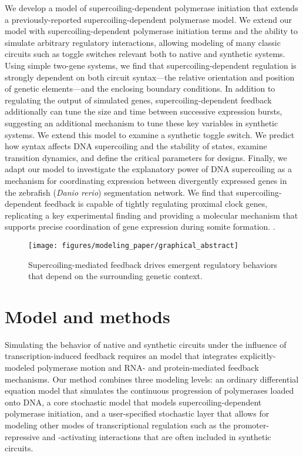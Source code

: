 \documentclass[11pt]{article}
\begin{document}
We develop a model of supercoiling-dependent polymerase initiation that extends a previously-reported supercoiling-dependent polymerase model.  \parencite{sevierPropertiesGeneExpression2018}  We extend our model with supercoiling-dependent polymerase initiation terms and the ability to simulate arbitrary regulatory interactions, allowing modeling of many classic circuits such as toggle switches relevant both to native and synthetic systems. Using simple two-gene systems, we find that supercoiling-dependent regulation is strongly dependent on both circuit syntax---the relative orientation and position of genetic elements---and the enclosing boundary conditions. In addition to regulating the output of simulated genes, supercoiling-dependent feedback additionally can tune the size and time between successive expression bursts, suggesting an additional mechanism to tune these key variables in synthetic systems. We extend this model to examine a synthetic toggle switch.
We predict how syntax affects DNA supercoiling and the stability of states, examine transition dynamics, and define the critical parameters for designs. Finally, we adapt our model to investigate the explanatory power of DNA supercoiling as a mechanism for coordinating expression between divergently expressed genes in the zebrafish (\textit{Danio rerio}) segmentation network. We find that supercoiling-dependent feedback is capable of tightly regulating proximal clock genes, replicating a key experimental finding and providing a molecular mechanism that supports precise coordination of gene expression during somite formation. \parencite{zinaniPairingSegmentationClock2021}.

\begin{figure}[h]
    \centering
    \texttt{[image: figures/modeling\_paper/graphical\_abstract]}
    \caption{Supercoiling-mediated feedback drives emergent regulatory behaviors that depend on the surrounding genetic context.} \label{fig:graphical_abstract}
\end{figure}

\section{Model and methods}
Simulating the behavior of native and synthetic circuits under the influence of transcription-induced feedback requires an model that integrates explicitly-modeled polymerase motion and RNA- and protein-mediated feedback mechanisms.
Our method combines three modeling levels: an ordinary differential equation model that simulates the continuous progression of polymerases loaded onto DNA, a core stochastic model that models supercoiling-dependent polymerase initiation, and a user-specified stochastic layer that allows for modeling other modes of transcriptional regulation such as the promoter-repressive and -activating interactions that are often included in synthetic circuits.
\end{document}
